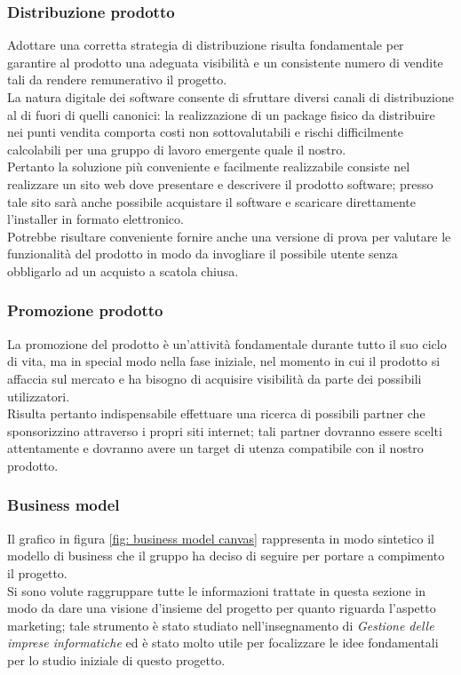 \subsubsection{Distribuzione prodotto}
Adottare una corretta strategia di distribuzione risulta fondamentale per garantire al prodotto una adeguata visibilità e un consistente numero di vendite tali da rendere remunerativo il progetto.\\
La natura digitale dei software consente di sfruttare diversi canali di distribuzione al di fuori di quelli canonici: la realizzazione di un package fisico da distribuire nei punti vendita comporta costi non sottovalutabili e rischi difficilmente calcolabili per una gruppo di lavoro emergente quale il nostro.\\
Pertanto la soluzione più conveniente e facilmente realizzabile consiste nel realizzare un sito web dove presentare e descrivere il prodotto software; presso tale sito sarà anche possibile acquistare il software e scaricare direttamente l'installer in formato elettronico.\\
Potrebbe risultare conveniente fornire anche una versione di prova per valutare le funzionalità del prodotto in modo da invogliare il possibile utente senza obbligarlo ad un acquisto a scatola chiusa.

\subsubsection{Promozione prodotto}
La promozione del prodotto è un'attività fondamentale durante tutto il suo ciclo di vita, ma in special modo nella fase iniziale, nel momento in cui il prodotto si affaccia sul mercato e ha bisogno di acquisire visibilità da parte dei possibili utilizzatori.\\
Risulta pertanto indispensabile effettuare una ricerca di possibili partner che sponsorizzino \NOMEPROGETTO{} attraverso i propri siti internet; tali partner dovranno essere scelti attentamente e dovranno avere un target di utenza compatibile con il nostro prodotto.

\subsubsection{Business model}
Il grafico in figura \ref{fig: business model canvas} rappresenta in modo sintetico il modello di business che il gruppo ha deciso di seguire per portare a compimento il progetto.\\
Si sono volute raggruppare tutte le informazioni trattate in questa sezione in modo da dare una visione d'insieme del progetto per quanto riguarda l'aspetto marketing; tale strumento è stato studiato nell'insegnamento di \textit{Gestione delle imprese informatiche} ed è stato molto utile per focalizzare le idee fondamentali per lo studio iniziale di questo progetto.

